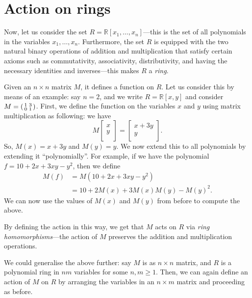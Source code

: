 \documentclass[12pt]{article}
\begin{document}
\section{Action on rings}
	
	Now, let us consider the set 
	$R = \mathbb{R}[x_{1}, \ldots, x_{n}]$---this is the set of all polynomials in the variables $x_{1}, \ldots, x_{n}$. 
	Furthermore, the set $R$ is equipped with the two natural binary operations of addition and multiplication that satisfy certain axioms such as commutativity, associativity, distributivity, and having the necessary identities and inverses---this makes $R$ a \emph{ring}. 

	Given an $n \times n$ matrix $M$, it defines a function on $R$. 
	Let us consider this by means of an example: say $n = 2$, and we write $R = \mathbb{R}[x, y]$ and consider $M = \left(\begin{smallmatrix} 1 & 3 \\ 0 & 1 \end{smallmatrix}\right)$. 
	First, we define the function on the variables $x$ and $y$ using matrix multiplication as following: 
	we have
	\begin{equation*} 
		M 
		\begin{bmatrix}
			x \\
			y \\
		\end{bmatrix}
		=
		\begin{bmatrix}
			x + 3y \\
			y \\
		\end{bmatrix}.
	\end{equation*}
	So, $M(x) = x + 3y$ and $M(y) = y$. 
	We now extend this to all polynomials by extending it ``polynomially''. 
	For example, if we have the polynomial 
	$f = 10 + 2 x + 3 x y - y^{2}$, then we define
	\begin{align*} 
		M(f) &= M(10 + 2 x + 3 x y - y^{2}) \\
		&= 10 + 2 M(x) + 3 M(x) M(y) - M(y)^{2}.
	\end{align*}
	We can now use the values of $M(x)$ and $M(y)$ from before to compute the above. 

	By defining the action in this way, we get that $M$ acts on $R$ via \emph{ring homomorphisms}---the action of $M$ preserves the addition and multiplication operations. 

	We could generalise the above further: say $M$ is as $n \times n$ matrix,
	and $R$ is a polynomial ring in $nm$ variables for some $n, m \ge 1$. 
	Then, we can again define an action of $M$ on $R$ by arranging the variables in an $n \times m$ matrix and proceeding as before. 
\end{document}
